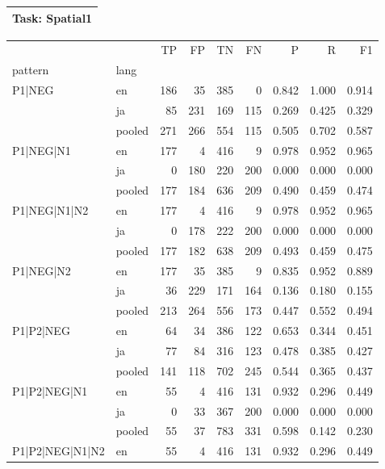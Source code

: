 
\begin{table}[h!]
\centering
\begin{tabular}{p{}}
\toprule
\textbf{Task: Spatial1} \\
\midrule
\end{tabular}
\vspace{10pt}
\begin{tabular}{llrrrrrrr}
\toprule
 &  & TP & FP & TN & FN & P & R & F1 \\
pattern & lang &  &  &  &  &  &  &  \\
\midrule
\multirow[t]{3}{*}{P1|NEG} & en & 186 & 35 & 385 & 0 & 0.842 & 1.000 & 0.914 \\
 & ja & 85 & 231 & 169 & 115 & 0.269 & 0.425 & 0.329 \\
 & pooled & 271 & 266 & 554 & 115 & 0.505 & 0.702 & 0.587 \\
\cline{1-9}
\multirow[t]{3}{*}{P1|NEG|N1} & en & 177 & 4 & 416 & 9 & 0.978 & 0.952 & 0.965 \\
 & ja & 0 & 180 & 220 & 200 & 0.000 & 0.000 & 0.000 \\
 & pooled & 177 & 184 & 636 & 209 & 0.490 & 0.459 & 0.474 \\
\cline{1-9}
\multirow[t]{3}{*}{P1|NEG|N1|N2} & en & 177 & 4 & 416 & 9 & 0.978 & 0.952 & 0.965 \\
 & ja & 0 & 178 & 222 & 200 & 0.000 & 0.000 & 0.000 \\
 & pooled & 177 & 182 & 638 & 209 & 0.493 & 0.459 & 0.475 \\
\cline{1-9}
\multirow[t]{3}{*}{P1|NEG|N2} & en & 177 & 35 & 385 & 9 & 0.835 & 0.952 & 0.889 \\
 & ja & 36 & 229 & 171 & 164 & 0.136 & 0.180 & 0.155 \\
 & pooled & 213 & 264 & 556 & 173 & 0.447 & 0.552 & 0.494 \\
\cline{1-9}
\multirow[t]{3}{*}{P1|P2|NEG} & en & 64 & 34 & 386 & 122 & 0.653 & 0.344 & 0.451 \\
 & ja & 77 & 84 & 316 & 123 & 0.478 & 0.385 & 0.427 \\
 & pooled & 141 & 118 & 702 & 245 & 0.544 & 0.365 & 0.437 \\
\cline{1-9}
\multirow[t]{3}{*}{P1|P2|NEG|N1} & en & 55 & 4 & 416 & 131 & 0.932 & 0.296 & 0.449 \\
 & ja & 0 & 33 & 367 & 200 & 0.000 & 0.000 & 0.000 \\
 & pooled & 55 & 37 & 783 & 331 & 0.598 & 0.142 & 0.230 \\
\cline{1-9}
\multirow[t]{3}{*}{P1|P2|NEG|N1|N2} & en & 55 & 4 & 416 & 131 & 0.932 & 0.296 & 0.449 \\

\end{tabular}
\end{table}
